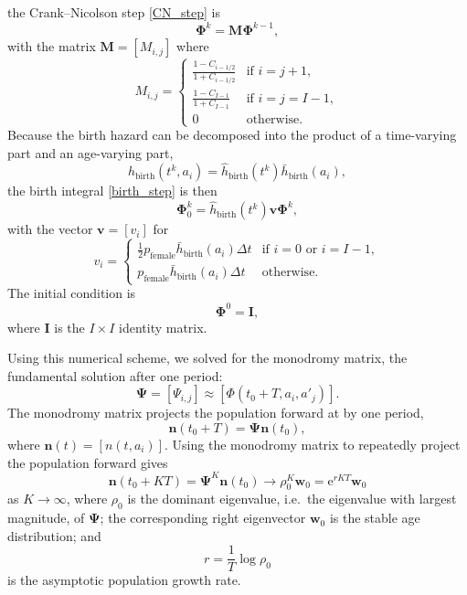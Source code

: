 \documentclass[12pt, USenglish]{article}  %
\renewcommand{\vec}[1]{\mathbf{#1}}
\newcommand{\mat}[1]{\mathbf{#1}}
\newcommand{\me}{\mathrm{e}}
\begin{document}
the Crank--Nicolson step \eqref{CN_step} is
\begin{equation}
  \mat{\Phi}^k = \mat{M} \mat{\Phi}^{k - 1},
\end{equation}
with the matrix $\mat{M} = [M_{i, j}]$ where
\begin{equation}
  M_{i, j} =
  \begin{cases}
    \frac{1 - C_{i - 1 / 2}}{1 + C_{i - 1 / 2}}
    & \text{if $i = j + 1$}, \\
    \frac{1 - C_{I - 1}}{1 + C_{I - 1}} & \text{if $i = j = I - 1$}, \\
    0 & \text{otherwise}.
  \end{cases}
\end{equation}
Because the birth hazard can be decomposed into the product of a
time-varying part and an age-varying part,
\begin{equation}
  h_{\text{birth}}(t^k, a_i)
  = \hat{h}_{\text{birth}}(t^k) \bar{h}_{\text{birth}}(a_i),
\end{equation}
the birth integral \eqref{birth_step} is then
\begin{equation}
  \mat{\Phi}_0^k = \hat{h}_{\text{birth}}(t^k) \vec{v} \mat{\Phi}^k,
\end{equation}
with the vector $\vec{v} = [v_i]$ for
\begin{equation}
  v_i =
  \begin{cases}
    \frac{1}{2} p_{\text{female}} \bar{h}_{\text{birth}}(a_i) \Delta t
    & \text{if $i = 0$ or $i = I - 1$}, \\
    p_{\text{female}} \bar{h}_{\text{birth}}(a_i) \Delta t
    & \text{otherwise}.
  \end{cases}
\end{equation}
The initial condition is
\begin{equation}
  \mat{\Phi}^0 = \mat{I},
\end{equation}
where $\mat{I}$ is the $I \times I$ identity matrix.

Using this numerical scheme, we solved for the monodromy matrix, the
fundamental solution after one period:
\begin{equation}
  \mat{\Psi} = [\Psi_{i, j}] \approx [\Phi(t_0 + T, a_i, a'_j)].
\end{equation}
The monodromy matrix projects the population forward at by one period,
\begin{equation}
  \vec{n}(t_0 + T) = \mat{\Psi} \vec{n}(t_0),
\end{equation}
where $\vec{n}(t) = [n(t, a_i)]$.
Using the monodromy matrix to repeatedly project the population
forward gives
\begin{equation}
  \vec{n}(t_0 + K T)
  = \mat{\Psi}^K \vec{n}(t_0)
  \to \rho_0^K \vec{w}_0
  = \me^{r K T} \vec{w}_0
\end{equation}
as $K \to \infty$,
where $\rho_0$ is the dominant eigenvalue, i.e.~the eigenvalue with
largest magnitude, of $\mat{\Psi}$;
the corresponding right eigenvector $\vec{w}_0$ is the stable age
distribution; and
\begin{equation}
  r = \frac{1}{T} \log \rho_0
\end{equation}
is the asymptotic population growth rate.
\end{document}
